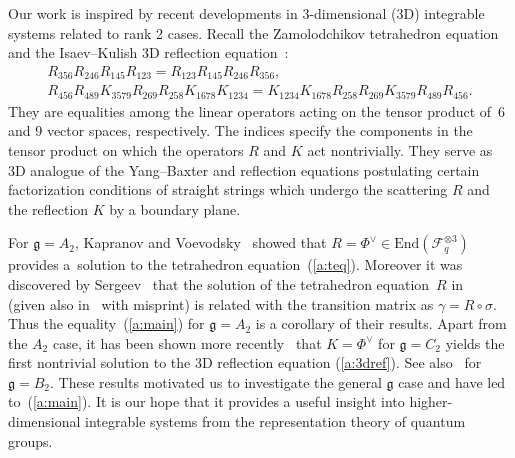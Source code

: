 \documentclass[pdftex]{sigma}
\newcommand{\geh}{\mathfrak{g}}
\begin{document}
Our work is inspired by recent developments in
3-dimensional (3D) integrable systems related to
rank 2 cases.
Recall the Zamolodchikov tetrahedron equation~\cite{Zam80}
and the Isaev--Kulish 3D ref\/lection equation~\cite{IK}:
\begin{gather}
{R}_{356}{R}_{246}{R}_{145}{R}_{123}
={R}_{123}{R}_{145}{R}_{246}{R}_{356}, \label{a:teq}\\
{R}_{456}{R}_{489}
{K}_{3579}{R}_{269}{R}_{258}
{K}_{1678}{K}_{1234}
={K}_{1234}
{K}_{1678}
{R}_{258}{R}_{269}
{K}_{3579}{R}_{489}{R}_{456}.\label{a:3dref}
\end{gather}
They are equalities among the linear operators acting on the
tensor product of~6 and 9 vector spaces, respectively.
The indices specify the components in the tensor product
on which the operators $R$ and $K$ act nontrivially.
They serve as 3D analogue of the Yang--Baxter and ref\/lection equations
postulating certain factorization conditions of straight strings
which undergo the scattering $R$ and the ref\/lection $K$ by a boundary plane.

For $\geh= A_2$,
Kapranov and Voevodsky~\cite{KV} showed that
$R=\Phi^{\vee} \in \mathrm{End}(\mathcal{F}_q^{\otimes 3})$
provides a~solution to the
tetrahedron equation~(\ref{a:teq}).
Moreover it was discovered by Sergeev~\cite{S08}  that
the solution of the tetrahedron equation~$R$ in~\cite{BS} (given also in~\cite{KV} with misprint)
is related with the transition matrix as $\gamma= R \circ \sigma$.
Thus the equality~(\ref{a:main})  for $\geh= A_2$ is a corollary of their results.
Apart from the $A_2$ case, it has been shown more recently~\cite{KO1} that
$K = \Phi^\vee$  for $\geh=C_2$ yields the f\/irst nontrivial
solution to the 3D ref\/lection equation (\ref{a:3dref}).
See also~\cite{KO2} for $\geh=B_2$.
These results motivated us to investigate the general $\geh$ case
and have led to~(\ref{a:main}).
It is our hope that it provides a useful insight into
higher-dimensional integrable systems from
the representation theory of quantum groups.
\end{document}
